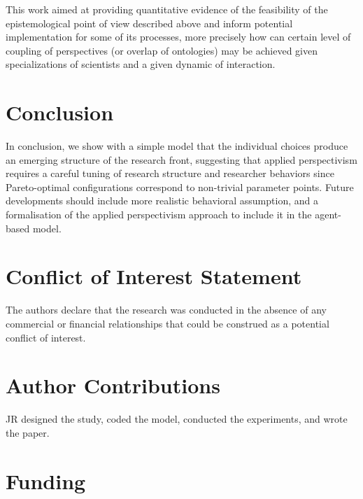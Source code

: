 \documentclass[utf8]{frontiersFPHY} %
\begin{document}
This work aimed at providing quantitative evidence of the feasibility of the epistemological point of view described above and inform potential implementation for some of its processes, more precisely how can certain level of coupling of perspectives (or overlap of ontologies) may be achieved given specializations of scientists and a given dynamic of interaction.





\section{Conclusion}

In conclusion, we show with a simple model that the individual choices produce an emerging structure of the research front, suggesting that applied perspectivism requires a careful tuning of research structure and researcher behaviors since Pareto-optimal configurations correspond to non-trivial parameter points. Future developments should include more realistic behavioral assumption, and a formalisation of the applied perspectivism approach to include it in the agent-based model.





\section*{Conflict of Interest Statement}

The authors declare that the research was conducted in the absence of any commercial or financial relationships that could be construed as a potential conflict of interest.

\section*{Author Contributions}

JR designed the study, coded the model, conducted the experiments, and wrote the paper.

\section*{Funding}
\end{document}
